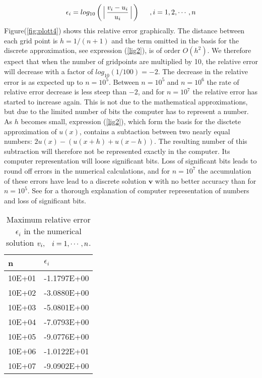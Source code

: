 \documentclass[11pt]{article}
\begin{document}
\begin{equation*}
\epsilon_i = log_{10}\left(\Big\arrowvert\frac{v_i - u_i}{u_i}\Big\arrowvert\right)
\hspace{5mm} , i= 1, 2, \cdots, n
\end{equation*}
Figure(\ref{fig:plott4}) shows this relative error graphically.
The distance between each grid point is $h = 1/(n+1)$ and the term omitted in the basis for the
discrete approximation, see expression (\ref{lig2}), is of order $O(h^2)$. We therefore expect 
that when the number of gridpoints are multiplied by 10, the relative error will decrease with
a factor of $log_{10}(1/100) = -2$. The decrease in the relative error is as expected up to
$n = 10^5$. Between $n = 10^5$ and $n = 10^6$ the rate of relative error decrease is less steep
than $-2$, and for 
$n = 10^7$ the relative error has started to increase again. This is not due to the mathematical
approximations, but due to the limited number of bits the computer has
to represent a number. As $h$ becomes small, expression (\ref{lig2}), which form the basis
for the disctete approximation of $u(x)$, contains a subtaction between two nearly equal numbers:
$2u(x)-(u(x+h) + u(x-h))$. The resulting number of this subtraction will therefore not be represented
exactly in the computer. Its computer representation will loose significant bits. Loss of significant 
bits leads to round off errors in the numerical calculations,
and for $n = 10^7$ the accumulation of these errors have lead to a discrete
solution $\mathbf v$ with no better accuracy than for $n = 10^5$. 
See \cite{mhh} for a thorough explanation of computer 
representation of numbers and loss of significant bits.    


\begin{table}[H]
\begin{center}
\begin{tabular}{|p{25mm}|p{25mm}|}
\hline
\hspace{8mm} n  & \hspace{4mm} $\epsilon_i$\\ \hline 
\hspace{4mm} 10E+01 & -1.1797E+00 \\ \hline
\hspace{4mm} 10E+02 & -3.0880E+00 \\ \hline
\hspace{4mm} 10E+03 & -5.0801E+00 \\ \hline
\hspace{4mm} 10E+04 & -7.0793E+00 \\ \hline
\hspace{4mm} 10E+05 & -9.0776E+00 \\ \hline
\hspace{4mm} 10E+06 & -1.0122E+01\\ \hline
\hspace{4mm} 10E+07 & -9.0902E+00\\ \hline
\end{tabular}
\end{center}
\caption{Maximum relative error $\epsilon _i$ in the numerical solution 
$v_i,\hspace{3mm} i = 1, \cdots, n$.}
\label{tabell3}
\end{table} 
\end{document}
